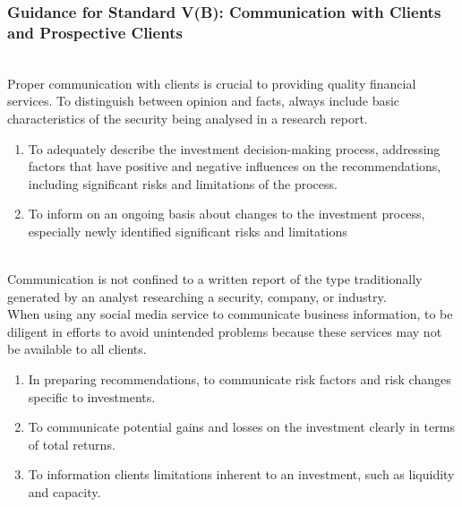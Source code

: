 \subsubsection{Guidance for Standard V(B): Communication with Clients and Prospective Clients}

\begin{remark} \\
Proper communication with clients is crucial to providing quality financial services. To distinguish between opinion and facts, always include basic characteristics of the security being analysed in a research report.
\end{remark}

\begin{remark} 
\begin{enumerate}[label=\roman*.]
\setlength{\itemsep}{0pt}
\item To adequately describe the investment decision-making process, addressing factors that have positive and negative influences on the recommendations, including significant risks and limitations of the process.
\item To inform on an ongoing basis about changes to the investment process, especially newly identified significant risks and limitations
\end{enumerate}
\end{remark}

\begin{remark} \\
Communication is not confined to a written report of the type traditionally generated by an analyst researching a security, company, or industry.\\
When using any social media service to communicate business information, to be diligent in efforts to avoid unintended problems because these services may not be available to all clients.
\end{remark}

\begin{remark} 
\begin{enumerate}[label=\roman*.]
\setlength{\itemsep}{0pt}
\item In preparing recommendations, to communicate risk factors and risk changes specific to investments.
\item To communicate potential gains and losses on the investment clearly in terms of total returns.
\item To information clients limitations inherent to an investment, such as liquidity and capacity.
\end{enumerate}
\end{remark}

